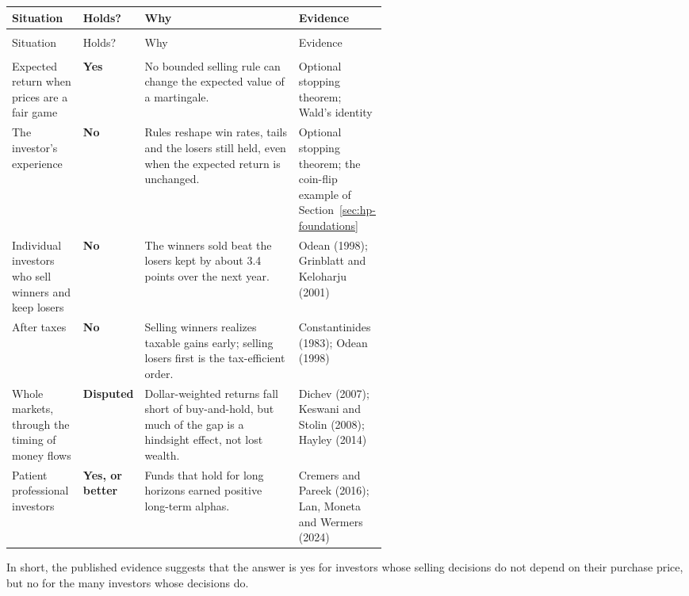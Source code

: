 \begingroup
\small
\setlength{\LTpre}{6pt}\setlength{\LTpost}{6pt}
\begin{longtable}{@{}>{\raggedright\arraybackslash}p{0.19\linewidth}>{\raggedright\arraybackslash}p{0.13\linewidth}>{\raggedright\arraybackslash}p{}>{\raggedright\arraybackslash}p{0.23\linewidth}@{}}
\toprule
Situation & Holds? & Why & Evidence \\
\midrule
\endfirsthead
\multicolumn{4}{@{}l}{\emph{(continued)}} \\
\toprule
Situation & Holds? & Why & Evidence \\
\midrule
\endhead
\midrule
\multicolumn{4}{r@{}}{\emph{(continued on the next page)}} \\
\endfoot
\bottomrule
\endlastfoot
Expected return when prices are a fair game & \textbf{Yes} & No bounded selling rule can change the expected value of a martingale. & Optional stopping theorem; Wald's identity \\*
\addlinespace[3pt]
The investor's experience & \textbf{No} & Rules reshape win rates, tails and the losers still held, even when the expected return is unchanged. & Optional stopping theorem; the coin-flip example of Section~\ref{sec:hp-foundations} \\
\addlinespace[3pt]
Individual investors who sell winners and keep losers & \textbf{No} & The winners sold beat the losers kept by about 3.4 points over the next year. & Odean (1998); Grinblatt and Keloharju (2001) \\
\addlinespace[3pt]
After taxes & \textbf{No} & Selling winners realizes taxable gains early; selling losers first is the tax-efficient order. & Constantinides (1983); Odean (1998) \\
\addlinespace[3pt]
Whole markets, through the timing of money flows & \textbf{Disputed} & Dollar-weighted returns fall short of buy-and-hold, but much of the gap is a hindsight effect, not lost wealth. & Dichev (2007); Keswani and Stolin (2008); Hayley (2014) \\*
\addlinespace[3pt]
Patient professional investors & \textbf{Yes, or better} & Funds that hold for long horizons earned positive long-term alphas. & Cremers and Pareek (2016); Lan, Moneta and Wermers (2024) \\
\end{longtable}
\addtocounter{table}{-1}%
\endgroup

In short, the published evidence suggests that the answer is yes for investors whose selling decisions do not depend on their purchase price, but no for the many investors whose decisions do.


